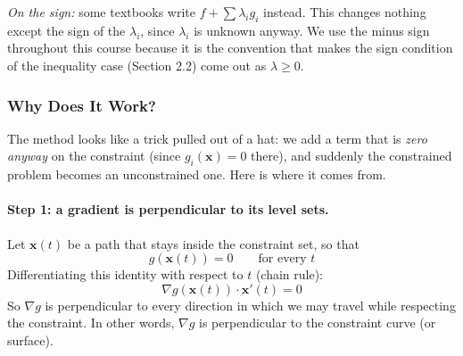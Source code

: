 \documentclass[]{article}
\begin{document}
	\textit{On the sign:} some textbooks write $f + \sum \lambda_i g_i$ instead.
	This changes nothing except the sign of the $\lambda_i$, since $\lambda_i$ is unknown anyway.
	We use the minus sign throughout this course because it is the convention that makes the sign condition of the inequality case (Section 2.2) come out as $\lambda \geq 0$.

	\subsubsection{Why Does It Work?}

	The method looks like a trick pulled out of a hat: we add a term that is \textit{zero anyway} on the constraint (since $g_i(\mathbf{x}) = 0$ there), and suddenly the constrained problem becomes an unconstrained one.
	Here is where it comes from.

	\paragraph{Step 1: a gradient is perpendicular to its level sets.}
	Let $\mathbf{x}(t)$ be a path that stays inside the constraint set, so that
	$$
	g(\mathbf{x}(t)) = 0 \qquad \text{for every } t
	$$
	Differentiating this identity with respect to $t$ (chain rule):
	$$
	\nabla g(\mathbf{x}(t)) \cdot \mathbf{x}'(t) = 0
	$$
	So $\nabla g$ is perpendicular to every direction in which we may travel while respecting the constraint.
	In other words, $\nabla g$ is perpendicular to the constraint curve (or surface).
\end{document}
